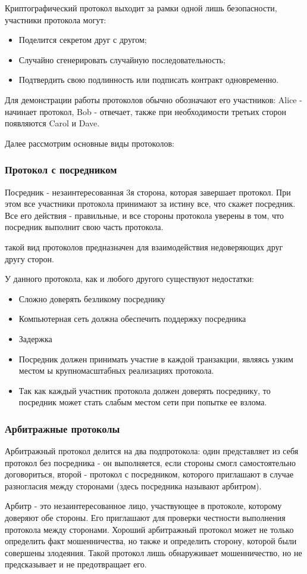 \documentclass[a4paper]{article}
\begin{document}
Криптографический протокол выходит за рамки одной лишь безопасности, участники протокола могут:
\begin{itemize}
    \item Поделится секретом друг с другом;
    \item Случайно сгенерировать случайную последовательность;
    \item Подтвердить свою подлинность или подписать контракт одновременно.
\end{itemize}

Для демонстрации работы протоколов обычно обозначают его участников: Alice - начинает протокол, Bob - отвечает, также при необходимости третьих сторон появляются Carol и Dave.
\par 
Далее рассмотрим основные виды протоколов: \par
\subsubsection*{Протокол с посредником}
Посредник - незаинтересованная 3я сторона, которая завершает протокол. При этом все участники протокола принимают за истину все, что скажет посредник. Все его действия - правильные, и все стороны протокола уверены в том, что посредник выполнит свою часть протокола.
\par такой вид протоколов предназначен для взаимодействия недоверяющих друг другу сторон.

У данного протокола, как и любого другого существуют недостатки:
\begin{itemize}
    \item Сложно доверять безликому посреднику
    \item Компьютерная сеть должна обеспечить поддержку посредника
    \item Задержка
    \item Посредник должен принимать участие в каждой транзакции, являясь узким местом ы крупномасштабных реализациях протокола.
    \item Так как каждый участник протокола должен доверять посреднику, то посредник может стать слабым местом сети при попытке ее взлома.
\end{itemize}
\subsubsection*{Арбитражные протоколы}
Арбитражный протокол делится на два подпротокола: один представляет из себя протокол без посредника - он выполняется, если стороны смогл самостоятельно договориться, второй - протокол с посредником, которого приглашают в случае разногласия между сторонами (здесь посредника называют арбитром).
\par 
Арбитр - это незаинтересованное лицо, участвующее в протоколе, которому доверяют обе стороны. Его приглашают для проверки честности выполнения протокола между сторонами.
Хороший арбитражный протокол может не только определить факт мошенничества, но также и определить сторону, которой были совершены злодеяния. Такой протокол лишь обнаруживает мошенничество, но не предсказывает и не предотвращает его.
\end{document}
